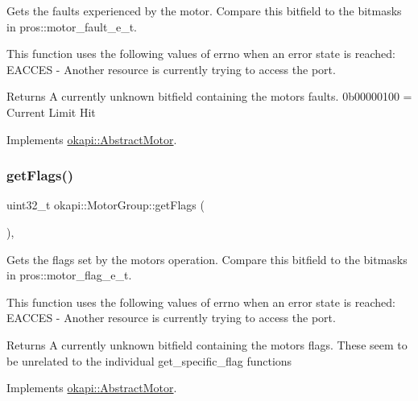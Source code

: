 Gets the faults experienced by the motor. Compare this bitfield to the bitmasks in pros\+::motor\+\_\+fault\+\_\+e\+\_\+t.

This function uses the following values of errno when an error state is reached\+: E\+A\+C\+C\+ES -\/ Another resource is currently trying to access the port.

\begin{DoxyReturn}{Returns}
A currently unknown bitfield containing the motor\textquotesingle{}s faults. 0b00000100 = Current Limit Hit 
\end{DoxyReturn}


Implements \mbox{\hyperlink{classokapi_1_1AbstractMotor_ae741463ec8de88c4f7ba854b5d6d7bce}{okapi\+::\+Abstract\+Motor}}.

\mbox{\label{classokapi_1_1MotorGroup_a5a8206be671413586f461a45132c9056}} 
\subsubsection{\texorpdfstring{getFlags()}{getFlags()}}
{\footnotesize\ttfamily uint32\+\_\+t okapi\+::\+Motor\+Group\+::get\+Flags (\begin{DoxyParamCaption}{ }\end{DoxyParamCaption})\hspace{0.3cm}{\ttfamily [override]}, {\ttfamily [virtual]}}

Gets the flags set by the motor\textquotesingle{}s operation. Compare this bitfield to the bitmasks in pros\+::motor\+\_\+flag\+\_\+e\+\_\+t.

This function uses the following values of errno when an error state is reached\+: E\+A\+C\+C\+ES -\/ Another resource is currently trying to access the port.

\begin{DoxyReturn}{Returns}
A currently unknown bitfield containing the motor\textquotesingle{}s flags. These seem to be unrelated to the individual get\+\_\+specific\+\_\+flag functions 
\end{DoxyReturn}


Implements \mbox{\hyperlink{classokapi_1_1AbstractMotor_aaae44487bf20ac2e18b52ee57b7a06ad}{okapi\+::\+Abstract\+Motor}}.

\mbox{\label{classokapi_1_1MotorGroup_abe6d309d6e883b469997c4ddc4584834}} 
